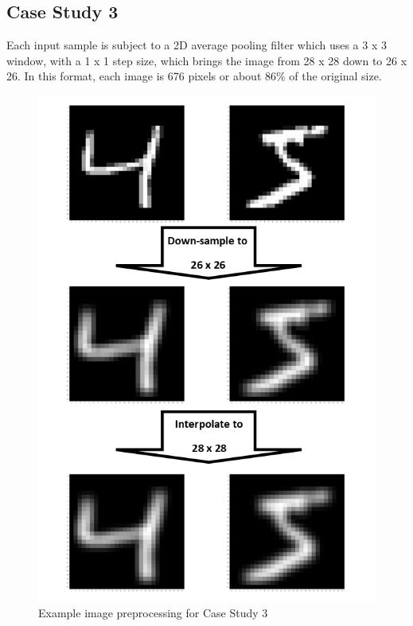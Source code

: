 \documentclass{IEEEtran}
\begin{document}
\subsection{Case Study 3}
Each input sample is subject to a 2D average pooling filter which uses a 3 x 3 window, with a 1 x 1 step size, which brings the image from 28 x 28 down to 26 x 26. In this format, each image is 676 pixels or about $86\%$ of the original size.
\begin{figure}[!h]
    \centering
    \includegraphics[scale=0.5]{fig/caseStudy3.png}
    \caption{Example image preprocessing for Case Study 3}
    \label{fig:caseStudy3}
\end{figure}
\end{document}
